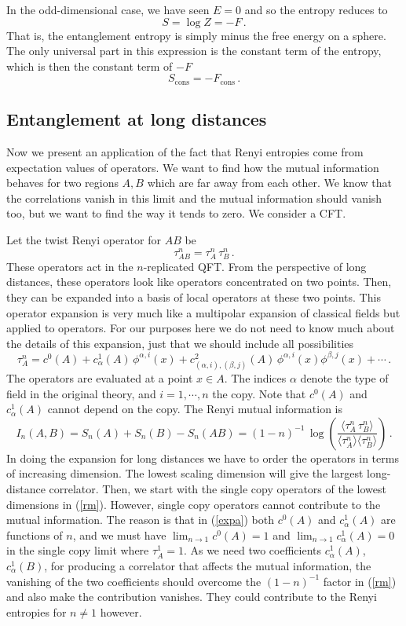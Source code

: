 \documentclass[11pt]{article}
\numberwithin{equation}{section}
\newcommand{\be}{\begin{equation}}
\newcommand{\ee}{\end{equation}}
\begin{document}
In the odd-dimensional case, we have seen $E=0$ and so
the entropy reduces to 
\be
S=\log Z=-F\,.
\ee
That is, the entanglement
entropy is simply minus the free energy on a sphere. The only universal part in this expression is the constant term of the entropy, which is then the constant term of $-F$
\be
S_{\textrm{cons}}=-F_{\textrm{cons}}\,.
\ee

\subsection{Entanglement at long distances}
\label{long}
Now we present an application of the fact that Renyi entropies come from expectation values of operators. We want to find how the mutual information behaves for two regions $A,B$ which are far away from each other. We know that the correlations vanish in this limit and the mutual information should vanish too, but we want to find the way it tends to zero. 
We consider a CFT.

Let the twist Renyi operator for $AB$ be
\be
\tau_{AB}^n=\tau_{A}^n \, \tau_B^n\,.
\ee
These operators act in the $n$-replicated QFT. From the perspective of long distances, these operators look like operators concentrated on two points. Then, they can be expanded into a basis of local operators at these two points. This operator expansion is very much like a multipolar expansion of classical fields but applied to operators. For our purposes here we do not need to know much about the details of this expansion, just that we should include all possibilities
\be
 \tau_{A}^n= c^0(A)+c^1_{\alpha}(A)\,\phi^{\alpha,i}(x)+ c^2_{(\alpha,i),(\beta,j)}(A)\, \phi^{\alpha,i}(x)\phi^{\beta,j}(x)+\cdots\,.  \label{expa}
\ee
The operators are evaluated at a point $x\in A$. The indices $\alpha$ denote the type
 of field in the original theory, and $i=1,\cdots,n$ the copy. Note that $c^0(A)$ and $c^1_{\alpha}(A)$ cannot depend on the copy.  
The Renyi mutual information is
\be
I_n(A,B)=S_n(A)+S_n(B)-S_n(AB)=(1-n)^{-1} \,\log\left(\frac{\langle \tau_{A}^n \, \tau_B^n\rangle}{\langle\tau_{A}^n \rangle \langle\tau_{B}^n \rangle}\right)\,.\label{rm}
\ee
In doing the expansion for long distances we have to order the operators in terms of increasing dimension. The lowest scaling dimension will give the largest long-distance correlator. Then, we start with the single copy operators of the lowest dimensions in (\ref{rm}). However, single copy operators cannot contribute to the mutual information. The reason is that in (\ref{expa}) both $c^0(A)$ and $c^1_{\alpha}(A)$ are functions of $n$, and we must have $\lim_{n\rightarrow 1} c^0(A)=1$ and $\lim_{n\rightarrow 1} c^1_{\alpha}(A)=0$ in the single copy limit where $\tau_A^1=1$. As we need two coefficients  $c^1_{\alpha}(A)$, $c^1_{\alpha}(B)$, for producing a correlator that affects the mutual information, the vanishing of the two coefficients should overcome the $(1-n)^{-1}$ factor in (\ref{rm}) and also make the contribution vanishes. They could contribute to the Renyi entropies for $n\neq 1$ however. 
\end{document}
